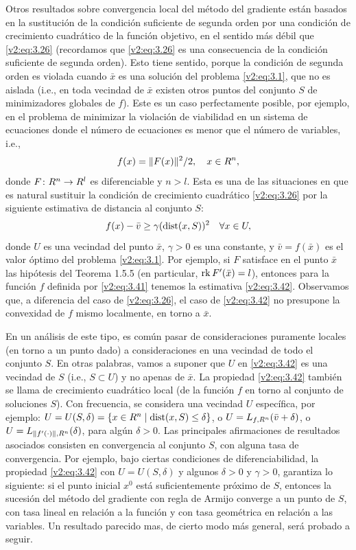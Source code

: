 Otros resultados sobre convergencia local del método del gradiente están basados en la sustitución de la condición suficiente de segunda orden por una condición de crecimiento cuadrático de la función objetivo, en el sentido más débil que \eqref{v2:eq:3.26} (recordamos que \eqref{v2:eq:3.26} es una consecuencia de la condición suficiente de segunda orden). Esto tiene sentido, porque la condición de segunda orden es violada cuando $\bar{x}$ es una solución del problema \eqref{v2:eq:3.1}, que no es aislada (i.e., en toda vecindad de $\bar{x}$ existen otros puntos del conjunto $S$ de minimizadores globales de $f$). Este es un caso perfectamente posible, por ejemplo, en el problema de minimizar la violación de viabilidad en un sistema de ecuaciones donde el número de ecuaciones es menor que el número de variables, i.e.,
\begin{equation}
    f(x) = \|F(x)\|^2/2, \quad x \in R^n,
    \label{v2:eq:3.41}
\end{equation}
donde $F \colon R^n \to R^l$ es diferenciable y $n > l$. Esta es una de las situaciones en que es natural sustituir la condición de crecimiento cuadrático \eqref{v2:eq:3.26} por la siguiente estimativa de distancia al conjunto $S$:
\begin{equation}
    f(x) - \bar{v} \ge \gamma (\operatorname{dist}(x, S))^2 \quad \forall x \in U,
    \label{v2:eq:3.42}
\end{equation}
donde $U$ es una vecindad del punto $\bar{x}$, $\gamma > 0$ es una constante, y $\bar{v} = f(\bar{x})$ es el valor óptimo del problema \eqref{v2:eq:3.1}. Por ejemplo, si $F$ satisface en el punto $\bar{x}$ las hipótesis del Teorema 1.5.5 (en particular, $\operatorname{rk} F'(\bar{x}) = l$), entonces para la función $f$ definida por \eqref{v2:eq:3.41} tenemos la estimativa \eqref{v2:eq:3.42}. Observamos que, a diferencia del caso de \eqref{v2:eq:3.26}, el caso de \eqref{v2:eq:3.42} no presupone la convexidad de $f$ mismo localmente, en torno a $\bar{x}$.

En un análisis de este tipo, es común pasar de consideraciones puramente locales (en torno a un punto dado) a consideraciones en una vecindad de todo el conjunto $S$. En otras palabras, vamos a suponer que $U$ en \eqref{v2:eq:3.42} es una vecindad de $S$ (i.e., $S \subset U$) y no apenas de $\bar{x}$. La propiedad \eqref{v2:eq:3.42} también se llama de crecimiento cuadrático local (de la función $f$ en torno al conjunto de soluciones $S$). Con frecuencia, se considera una vecindad $U$ específica, por ejemplo: $U = U(S, \delta) = \{x \in R^n \mid \operatorname{dist}(x, S) \le \delta\}$, o $U = L_{f, R^n}(\bar{v} + \delta)$, o $U = L_{\|f'(\cdot)\|, R^n}(\delta)$, para algún $\delta > 0$.
Las principales afirmaciones de resultados asociados consisten en convergencia al conjunto $S$, con alguna tasa de convergencia. Por ejemplo, bajo ciertas condiciones de diferenciabilidad, la propiedad \eqref{v2:eq:3.42} con $U = U(S, \delta)$ y algunos $\delta > 0$ y $\gamma > 0$, garantiza lo siguiente: si el punto inicial $x^0$ está suficientemente próximo de $S$, entonces la sucesión del método del gradiente con regla de Armijo converge a un punto de $S$, con tasa lineal en relación a la función y con tasa geométrica en relación a las variables. Un resultado parecido mas, de cierto modo más general, será probado a seguir.


